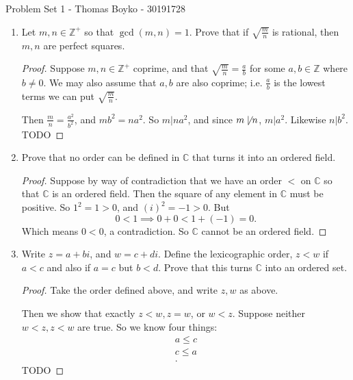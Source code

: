 \documentclass{article}
\begin{document}
    \huge Problem Set 1 - Thomas Boyko - 30191728
    \normalsize
\begin{enumerate} 

    \item Let $m,n\in \mathbb{Z}^{+}$ so that $\gcd(m,n)=1$. Prove that if $\sqrt{\frac{m}{n}} $ is rational, then $m,n$ are perfect squares.
        \begin{proof} 
            Suppose $m,n\in \mathbb{Z}^{+}$ coprime, and that $\sqrt{\frac{m}{n}} =\frac{a}{b}$ for some $a,b\in \mathbb{Z}$ where $b\neq 0$. We may also assume that $a,b$ are also coprime; i.e. $\frac{a}{b}$ is the lowest terms we can put $\sqrt{\frac{m}{n}} $.

            Then $\frac{m}{n}=\frac{a^2}{b^2}$, and $mb^2=na^2$. So $m|na^2$, and since
            $m\not\mid n$, $m|a^2$. Likewise $n|b^2$. 
            TODO
        \end{proof}

    \item Prove that no order can be defined in $\mathbb{C}$ that turns it into an ordered field.

        \begin{proof} 
            Suppose by way of contradiction that we have an order $<$ on $\mathbb{C}$ so that
            $\mathbb{C}$ is an ordered field. Then the square of any element in $\mathbb{C}$ must
            be positive. So $1^2=1>0$, and $(i)^2=-1>0$. But
            \[
            0<1\implies 0+0<1+(-1)=0
            .\] 
            Which means $0<0$, a contradiction. So $\mathbb{C}$ cannot be an ordered field.
        \end{proof}

    \item Write $z=a+bi$, and $w=c+di$. Define the lexicographic order, $z<w$ if $a<c$ and also if
        $a=c$ but $b<d$. Prove that this turns $\mathbb{C}$ into an ordered set.

        \begin{proof} 
            Take the order defined above, and write $z,w$ as above.

            Then we show that exactly $z<w,z=w$, or $w<z$. Suppose neither $w<z,z<w$ are true.
            So we know four things:
            \begin{align*}
                a\leq c\\
                c\leq a\\
            .\end{align*}   
            TODO


\end{proof}
\end{enumerate}
\end{document}
